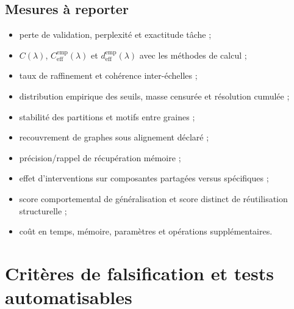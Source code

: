\documentclass[11pt,a4paper]{article}
\theoremstyle{remark}
\begin{document}
\subsection{Mesures à reporter}
\begin{itemize}
  \item perte de validation, perplexité et exactitude tâche ;
  \item $C(\lambda)$, $C_{\mathrm{eff}}^{\mathrm{emp}}(\lambda)$ et $d_{\mathrm{eff}}^{\mathrm{emp}}(\lambda)$ avec les méthodes de calcul ;
  \item taux de raffinement et cohérence inter-échelles ;
  \item distribution empirique des seuils, masse censurée et résolution cumulée ;
  \item stabilité des partitions et motifs entre graines ;
  \item recouvrement de graphes sous alignement déclaré ;
  \item précision/rappel de récupération mémoire ;
  \item effet d'interventions sur composantes partagées versus spécifiques ;
  \item score comportemental de généralisation et score distinct de réutilisation structurelle ;
  \item coût en temps, mémoire, paramètres et opérations supplémentaires.
\end{itemize}

\section{Critères de falsification et tests automatisables}
\end{document}
